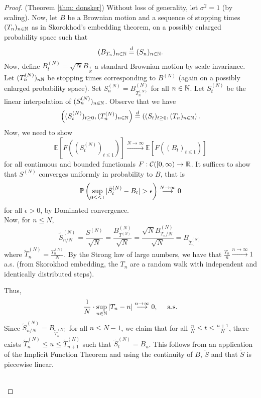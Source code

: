 \documentclass{article}
\begin{document}
\begin{proof}{(Theorem \ref{thm: donsker})}
    Without loss of generality, let $ \sigma^{2}=1$ (by scaling). Now, let $B$ be a Brownian motion and a sequence of stopping times $ (T_{n})_{n\in \mathbb{N}}$ as in Skorokhod's embedding theorem, on a possibly enlarged probability space such that 
    \[
	    (B_{T_{n}})_{n\in \mathbb{N}} \stackrel{d}{=} (S_{n})_{n\in \mathbb{N}}.
    \]
Now, define $ B^{(N)}_{t}= \sqrt{N}B_{\frac{t}{N}}$ a standard Brownian motion by scale invariance. Let $ (T^{(N)}_{n})_{n\mathbb{N}}$ be stopping times corresponding to $ B^{(N)}$ (again on a possibly enlarged probability space). Set $ S^{(N)}_{n} = B^{(N)}_{T^{(N)}_{n}}$ for all $ n\in \mathbb{N}$. Let $ S^{(N)}_{t}$ be the linear interpolation of $ (S^{(N)}_{n})_{n\in \mathbb{N}}$. Observe that we have 
    \[
	    \left( (S^{(N)}_{t})_{t\geq 0}, (T^{(N)}_{n})_{n\in \mathbb{N}} \right) \stackrel{d}{=} \left( (S_{t})_{t\geq 0}, (T_{n})_{n\in \mathbb{N}} \right).
    \]
Now, we need to show 
    \[
	    \mathbb{E}\left[ F \left( (S^{(N)}_{t})_{t\leq 1} \right) \right] \stackrel{N\to \infty}{\longrightarrow} \mathbb{E}\left[ F \left( (B_{t})_{t\leq 1} \right) \right] 
    \]
    for all continuous and bounded functionals $ F: \mathcal{C}([0,\infty)\to \mathbb{R}$. It suffices to show that $ S^{(N)}$ converges uniformly in probability to $ B$, that is 
    \[
	    \PP \left( \displaystyle\sup_{0\leq \leq 1} |\tilde{S}^{(N)}_{t}-B_{t}|>\epsilon \right) \stackrel{N\to \infty}{\longrightarrow} 0 
    \]
    for all $ \epsilon>0$, by Dominated convergence.\\ 

    Now, for $n\leq N $, 
    \[
	    \tilde{S}^{(N)}_{n/N} = \frac{S^{(N)}}{\sqrt{N}} = \frac{B^{(N)}_{T^{(N)}}}{\sqrt{N}} = \frac{\sqrt{N}B^{(N)}_{T_{n}/N}}{\sqrt{N}} = B_{\tilde{T}^{(N)}_{n}}\,
    \]
    where $ \tilde{T}^{(N)}_{n} = \frac{T^{(N)}_{n}}{N}$. By the Strong law of large numbers, we have that $ \frac{T_{n}}{n}\stackrel{n\to \infty}{\longrightarrow} 1$ a.s. (from Skorokhod embedding, the $ T_{n}$ are a random walk with independent and identically distributed steps). 
    \parbox[b]{0.4\textwidth}{Thus, 
    \[
    \frac{1}{N}\cdot \displaystyle\sup_{n\in \mathbb{N}}|T_{n}-n|\stackrel{n\to \infty}{\longrightarrow}0, \quad \text{ a.s.}
    \]
    Since $ \tilde{S}^{(N)}_{n/N}= B_{\tilde{T}^{(N)}_{n}}$ for all $ n\leq N-1$, we claim that for all $ \frac{n}{N}\leq t\leq \frac{n+1}{N}$, there exists $ \tilde{T}^{(N)}_{n}\leq u\leq \tilde{T}^{(N)}_{n+1}$ such that $ \tilde{S}^{(N)}_{t} = B_{u}$. This follows from an application of the Implicit Function Theorem and using the continuity of $ B$, $ \tilde{S}$ and that $ \tilde{S}$ is piecewise linear.}\makebox[2cm]{}\parbox[b]{0.4\textwidth}{
    
    }\\ 


\end{proof}
\end{document}
